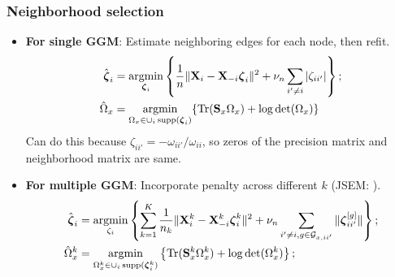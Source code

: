 \documentclass[10pt]{beamer}
\theoremstyle{definition}
\DeclareMathOperator*{\Tr}{Tr}
\DeclareMathOperator*{\argmin}{argmin}
\DeclareMathOperator*{\supp}{\text{supp}}
\begin{document}
\begin{frame}
\frametitle{Neighborhood selection}

\begin{itemize}
\item {\bf For single GGM}: Estimate neighboring edges for each node, then refit.
%
\begin{align*}
\hat \bfzeta_i &= \argmin_{\bfzeta_i} \left\{ \frac{1}{n} \| \bfX_i - \bfX_{-i} \bfzeta_i \|^2 + \nu_n \sum_{i' \neq i} |\zeta_{ii'}| \right\};\\
\hat \Omega_x &= \argmin_{\Omega_x \in \cup_i \supp (\bfzeta_i)}
\{ \Tr (\bfS_x \Omega_x ) + \log \det(\Omega_x) \}
\end{align*}
%
Can do this because $\zeta_{ii'} = -\omega_{ii'}/\omega_{ii}$, so zeros of the precision matrix and neighborhood matrix are same.

\item {\bf For multiple GGM}: Incorporate penalty across different $k$ (JSEM: \cite{MaMichailidis15}).
%
\begin{align*}
\hat \bfzeta_i &= \argmin_{\zeta_i} \left\{ \sum_{k=1}^K \frac{1}{n_k} \| \bfX_i^k - \bfX_{-i}^k \bfzeta_i^k \|^2 + \nu_n \sum_{i' \neq i, g \in \cG_{x,ii'}} \| \bfzeta_{ii'}^{[g]} \| \right\};\\
\hat \Omega_x^k &= \argmin_{\Omega_x^k \in \cup_i \supp (\bfzeta_i^k)}
\left\{ \Tr (\bfS_x^k \Omega_x^k ) + \log \det (\Omega_x^k ) \right\}; \end{align*}
%
\end{itemize}
\end{frame}
\end{document}
